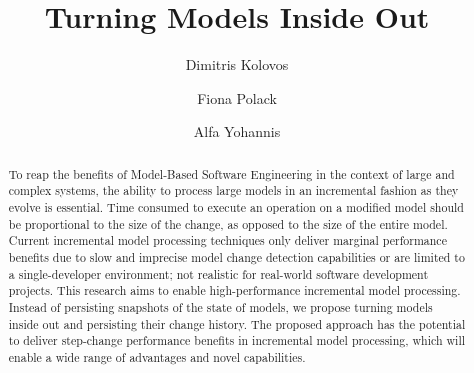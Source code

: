 \documentclass{llncs}
\begin{document}
\renewcommand{\thelstlisting}{\arabic{lstlisting}}
\renewcommand{\labelitemi}{$\bullet$}

\title{Turning Models Inside Out}
%
%
\author{Dimitris Kolovos \and Fiona Polack \and Alfa Yohannis}
%
%
%

\maketitle              %

\begin{abstract}
To reap the benefits of Model-Based Software Engineering in the context of large and complex systems, the ability to process large models in an incremental fashion as they evolve is essential. Time consumed to execute an operation on a modified model should be proportional to the size of the change, as opposed to the size of the entire model. Current incremental model processing techniques only deliver marginal performance benefits due to slow and imprecise model change detection capabilities or are limited to a single-developer environment; not realistic for real-world software development projects. This research aims to enable high-performance incremental model processing. Instead of persisting snapshots of the state of models, we propose turning models inside out and persisting their change history. The proposed approach has the potential to deliver step-change performance benefits in incremental model processing, which will enable a wide range of advantages and novel capabilities.
\end{abstract}
\end{document}
